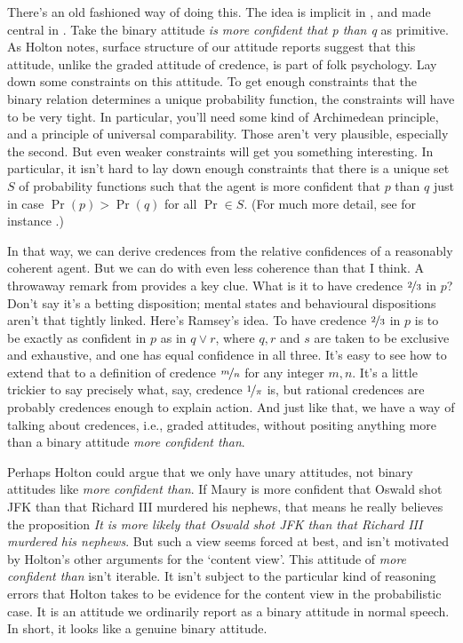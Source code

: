 There's an old fashioned way of doing this. The idea is implicit in \cite{RamseyTruthProb}, and made central in \cite{DeFinetti1964}. Take the binary attitude \textit{is more confident that p than q} as primitive. As Holton notes, surface structure of our attitude reports suggest that this attitude, unlike the graded attitude of credence, is part of folk psychology. Lay down some constraints on this attitude. To get enough constraints that the binary relation determines a unique probability function, the constraints will have to be very tight. In particular, you'll need some kind of Archimedean principle, and a principle of universal comparability. Those aren't very plausible, especially the second. But even weaker constraints will get you something interesting. In particular, it isn't hard to lay down enough constraints that there is a unique set $S$ of probability functions such that the agent is more confident that $p$ than $q$ just in case $\Pr( p) > \Pr(q)$ for all $\Pr \in S$. (For much more detail, see for instance \cite{Walley1991}.) 

In that way, we can derive credences from the relative confidences of a reasonably coherent agent. But we can do with even less coherence than that I think. A throwaway remark from \cite{Ramsey1929} provides a key clue. What is it to have credence $\nicefrac{2}{3}$ in $p$? Don't say it's a betting disposition; mental states and behavioural dispositions aren't that tightly linked. Here's Ramsey's idea. To have credence $\nicefrac{2}{3}$ in $p$ is to be exactly as confident in $p$ as in $q \vee r$, where $q, r$ and $s$ are taken to be exclusive and exhaustive, and one has equal confidence in all three. It's easy to see how to extend that to a definition of credence $\nicefrac{m}{n}$ for any integer $m, n$. It's a little trickier to say precisely what, say, credence $\nicefrac{1}{\pi}$ is, but rational credences are probably credences enough to explain action. And just like that, we have a way of talking about credences, i.e., graded attitudes, without positing anything more than a binary attitude \textit{more confident than}.

Perhaps Holton could argue that we only have unary attitudes, not binary attitudes like \textit{more confident than}. If Maury is more confident that Oswald shot JFK than that Richard III murdered his nephews, that means he really believes the proposition \textit{It is more likely that Oswald shot JFK than that Richard III murdered his nephews}. But such a view seems forced at best, and isn't motivated by Holton's other arguments for the `content view'. This attitude of \textit{more confident than} isn't iterable. It isn't subject to the particular kind of reasoning errors that Holton takes to be evidence for the content view in the probabilistic case. It is an attitude we ordinarily report as a binary attitude in normal speech. In short, it looks like a genuine binary attitude.

